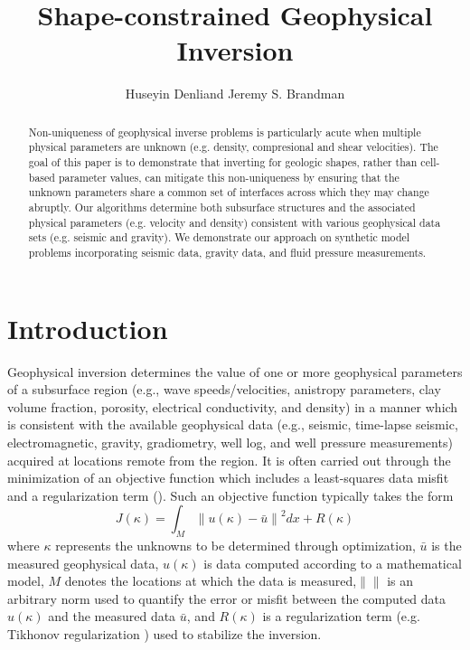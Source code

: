 \documentclass[manuscript,revised]{geophysics}
\newcommand\norm[1]{\left\lVert#1\right\rVert}
\begin{document}
\title{Shape-constrained Geophysical Inversion}

\renewcommand{\thefootnote}{\fnsymbol{footnote}} 

\address{
\footnotemark[1] ExxonMobil Research \& Engineering Company, \\
1545 Route 22E, Annandale, NJ 08801}
\author{Huseyin Denli\footnotemark[1] and Jeremy S. Brandman\footnotemark[1]}

\maketitle

\begin{abstract}
Non-uniqueness of geophysical inverse problems is particularly acute when multiple physical parameters are unknown (e.g. density, compresional and shear velocities). The goal of this paper is to demonstrate that inverting for geologic shapes, rather than cell-based parameter values, can mitigate this non-uniqueness by ensuring that the unknown parameters share a common set of interfaces across which they may change abruptly. Our algorithms determine both subsurface structures and the associated physical parameters (e.g. velocity and density) consistent with various geophysical data sets (e.g. seismic and gravity).  We demonstrate our approach on synthetic model problems incorporating seismic data, gravity data, and fluid pressure measurements.  
\end{abstract}

\section{Introduction}
Geophysical inversion determines the value of one or more geophysical parameters of a subsurface region (e.g., wave speeds/velocities, anistropy parameters, clay volume fraction, porosity, electrical conductivity, and density) in a manner which is consistent with the available geophysical data (e.g., seismic, time-lapse seismic, electromagnetic, gravity, gradiometry, well log, and well pressure measurements)  acquired at locations remote from the region.  It is often carried out through the minimization of an objective function which includes a least-squares data misfit and a regularization term (\cite{Parker_1994}). Such an objective function typically takes the form
\begin{equation} \label{eq:objective}
J\left(\kappa\right) = \int_M \norm{u(\kappa)-\bar{u}}^2  dx + R\left(\kappa\right)
\end{equation}
where $\kappa$ represents the unknowns to be determined through optimization, $\bar{u}$ is the measured geophysical data, $u(\kappa)$ is data computed according to a mathematical model, $M$ denotes the locations at which the data is measured,$\norm{}$ is an arbitrary norm used to quantify the error or misfit between the computed data $u(\kappa)$ and the measured data $\bar{u}$, and $R\left(\kappa\right)$ is a regularization term (e.g. Tikhonov regularization ) used to stabilize the inversion. 
\end{document}

